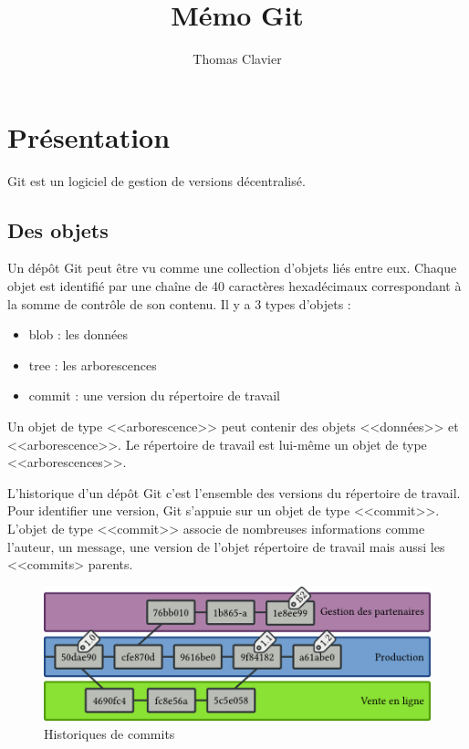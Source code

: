 \documentclass[a4paper]{article}
\title{Mémo Git}
\author{Thomas Clavier}
\date{}
\begin{document}
\maketitle

\section*{Présentation}

Git est un logiciel de gestion de versions décentralisé.

\subsection*{Des objets}
Un dépôt Git peut être vu comme une collection d’objets liés entre eux. 
Chaque objet est identifié par une chaîne de 40 caractères hexadécimaux
correspondant à la somme de contrôle de son contenu. 
Il y a 3 types d'objets : 
\begin{itemize}
\item blob : les données
\item tree : les arborescences
\item commit : une version du répertoire de travail
\end{itemize}
Un objet de type <<arborescence>> peut contenir des objets <<données>> et <<arborescence>>.
Le répertoire de travail est lui-même un objet de type <<arborescences>>. 

L'historique d'un dépôt Git c'est l'ensemble des versions du répertoire de travail. Pour identifier une version, Git s'appuie sur un objet de type <<commit>>. 
L'objet de type <<commit>> associe de nombreuses informations comme l'auteur, un message, une version de l'objet répertoire de travail mais aussi les <<commits> parents.

\begin{figure}[h]
  \center
  \includegraphics{graphs}
  \caption{Historiques de commits}
\end{figure}
\end{document}
